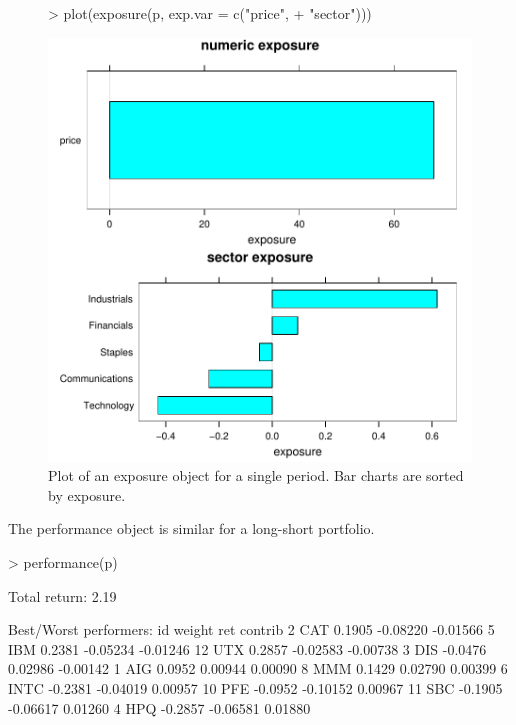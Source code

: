\documentclass[a4paper]{report}
\begin{document}
\begin{article}
\begin{figure}
\centering
\vspace*{.1in}
\begin{Schunk}
\begin{Sinput}
> plot(exposure(p, exp.var = c("price", 
+     "sector")))
\end{Sinput}
\end{Schunk}
\includegraphics{portfolio-012}
\caption{\label{figure:plot.exposure} Plot of an exposure object for a
single period.  Bar charts are sorted by exposure.}
\end{figure}

The performance object is similar for a long-short portfolio.

\begin{Schunk}
\begin{Sinput}
> performance(p)
\end{Sinput}
\begin{Soutput}
Total return:  2.19 %

Best/Worst performers:
     id  weight      ret  contrib
2   CAT  0.1905 -0.08220 -0.01566
5   IBM  0.2381 -0.05234 -0.01246
12  UTX  0.2857 -0.02583 -0.00738
3   DIS -0.0476  0.02986 -0.00142
1   AIG  0.0952  0.00944  0.00090
8   MMM  0.1429  0.02790  0.00399
6  INTC -0.2381 -0.04019  0.00957
10  PFE -0.0952 -0.10152  0.00967
11  SBC -0.1905 -0.06617  0.01260
4   HPQ -0.2857 -0.06581  0.01880
\end{Soutput}
\end{Schunk}


\end{article}
\end{document}

